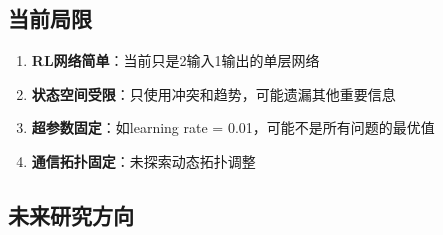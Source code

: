 \documentclass[15pt,a3paper]{ctexart}
\begin{document}
\subsection{当前局限}

\begin{enumerate}
    \item \textbf{RL网络简单}：当前只是2输入1输出的单层网络
    \item \textbf{状态空间受限}：只使用冲突和趋势，可能遗漏其他重要信息
    \item \textbf{超参数固定}：如learning rate = 0.01，可能不是所有问题的最优值
    \item \textbf{通信拓扑固定}：未探索动态拓扑调整
\end{enumerate}

\subsection{未来研究方向}
\end{document}
